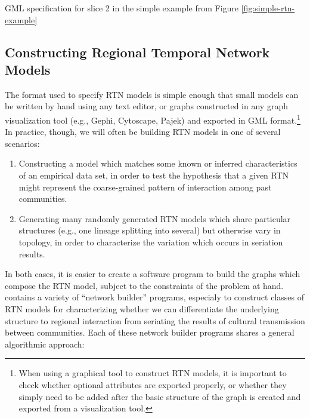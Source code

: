 \begin{listing}[!h]
\inputminted{text}{objects/slice-002.gml.txt}
\caption{GML specification for slice 2 in the simple example from Figure \ref{fig:simple-rtn-example}}
\label{listing:slice-002-gml}
\end{listing}

\subsection{Constructing Regional Temporal Network Models}

The format used to specify RTN models is simple enough that small models can be written by hand using any text editor, or graphs constructed in any graph visualization tool (e.g., Gephi, Cytoscape, Pajek) and exported in GML format.\footnote{When using a graphical tool to construct RTN models, it is important to check whether optional attributes are exported properly, or whether they simply need to be added after the basic structure of the graph is created and exported from a visualization tool.}  In practice, though, we will often be building RTN models in one of several scenarios:

\begin{enumerate}[label=\emph{\arabic*})]
	\item Constructing a model which matches some known or inferred characteristics of an empirical data set, in order to test the hypothesis that a given RTN might represent the coarse-grained pattern of interaction among past communities.
	\item Generating many randomly generated RTN models which share particular structures (e.g., one lineage splitting into several) but otherwise vary in topology, in order to characterize the variation which occurs in seriation results.
\end{enumerate}

In both cases, it is easier to create a software program to build the graphs which compose the RTN model, subject to the constraints of the problem at hand.  \seriationct contains a variety of ``network builder'' programs, especialy to construct classes of RTN models for characterizing whether we can differentiate the underlying structure to regional interaction from seriating the results of cultural transmission between communities.  Each of these network builder programs shares a general algorithmic approach:


